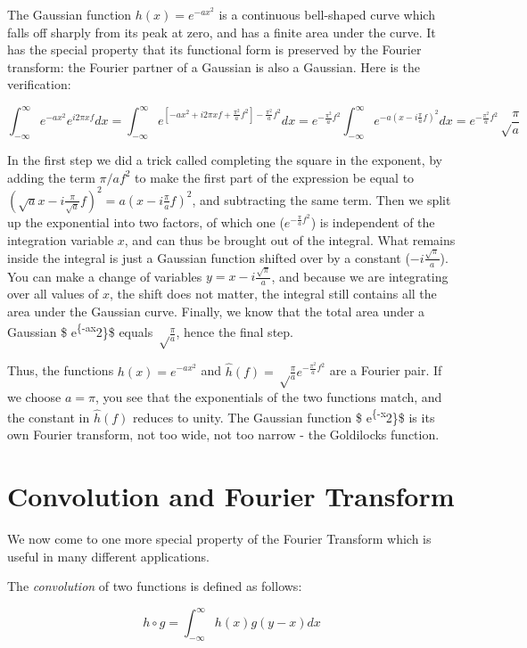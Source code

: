 \documentclass[
  letterpaper,
  DIV=11,
  numbers=noendperiod]{scrreprt}
\begin{document}
The Gaussian function \(h(x)= e^{-ax^2}\) is a continuous bell-shaped
curve which falls off sharply from its peak at zero, and has a finite
area under the curve. It has the special property that its functional
form is preserved by the Fourier transform: the Fourier partner of a
Gaussian is also a Gaussian. Here is the verification:

\[
\int_{-\infty} ^\infty e^{-ax^2} e^{i2\pi xf} dx = \int_{-\infty} ^\infty e^{[-ax^2+i2\pi xf +\frac{\pi^2}{a}f^2] - \frac{\pi^2}{a}f^2}dx = e^{- \frac{\pi^2}{a}f^2} \int_{-\infty} ^\infty e^{-a(x-i\frac{\pi}{a}f)^2}dx = e^{- \frac{\pi^2}{a}f^2}  \sqrt\frac{\pi}{a}
\]

In the first step we did a trick called completing the square in the
exponent, by adding the term \(\pi/a f^2\) to make the first part of the
expression be equal to
\((\sqrt{a}x-i\frac{\pi}{\sqrt{a}}f)^2=a(x-i\frac{\pi}{a}f)^2\), and
subtracting the same term. Then we split up the exponential into two
factors, of which one (\(e^{- \frac{\pi}{a}f^2}\)) is independent of the
integration variable \(x\), and can thus be brought out of the integral.
What remains inside the integral is just a Gaussian function shifted
over by a constant (\(-i\frac{\sqrt\pi}{a}\)). You can make a change of
variables \(y=x-i\frac{\sqrt\pi}{a}\), and because we are integrating
over all values of \(x\), the shift does not matter, the integral still
contains all the area under the Gaussian curve. Finally, we know that
the total area under a Gaussian \$ e\textsuperscript{\{-ax}2\}\$ equals
\(\sqrt\frac{\pi}{a}\), hence the final step.

Thus, the functions \(h(x)= e^{-ax^2}\) and
\(\widehat h(f) = \sqrt\frac{\pi}{a} e^{- \frac{\pi^2}{a}f^2}\) are a
Fourier pair. If we choose \(a = \pi\), you see that the exponentials of
the two functions match, and the constant in \(\widehat h(f)\) reduces
to unity. The Gaussian function \$ e\textsuperscript{\{-\pi x}2\}\$ is
its own Fourier transform, not too wide, not too narrow - the Goldilocks
function.

\section{Convolution and Fourier
Transform}\label{convolution-and-fourier-transform}

We now come to one more special property of the Fourier Transform which
is useful in many different applications.

\begin{tcolorbox}[enhanced jigsaw, toptitle=1mm, colback=white, arc=.35mm, opacitybacktitle=0.6, colframe=quarto-callout-note-color-frame, left=2mm, leftrule=.75mm, rightrule=.15mm, breakable, opacityback=0, toprule=.15mm, titlerule=0mm, bottomtitle=1mm, title=\textcolor{quarto-callout-note-color}{\faInfo}\hspace{0.5em}{Definition}, bottomrule=.15mm, colbacktitle=quarto-callout-note-color!10!white, coltitle=black]

The \emph{convolution} of two functions is defined as follows:

\[ h\circ g = \int _{-\infty} ^\infty h(x) g(y-x) dx \]

\end{tcolorbox}
\end{document}
